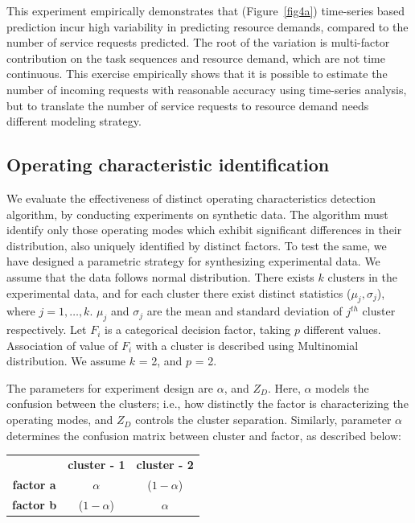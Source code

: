 \documentclass[twoside,leqno,twocolumn]{article}
\begin{document}
This experiment empirically demonstrates that (Figure~\ref{fig4a}) time-series based prediction incur high variability in predicting resource demands, compared to the number of service requests predicted. The root of the variation is multi-factor contribution on the task sequences and resource demand, which are not time continuous. This exercise empirically shows that it is possible to estimate the number of incoming requests with reasonable accuracy using time-series analysis, but to translate the number of service requests to resource demand needs different modeling strategy.   

\subsection{Operating characteristic identification}
We evaluate the effectiveness of distinct operating characteristics detection algorithm, by conducting experiments on synthetic data. The algorithm must identify only those operating modes which exhibit significant differences in their distribution, also uniquely identified by distinct factors. To test the same, we have designed a parametric strategy for synthesizing experimental data. We assume that the data follows normal distribution. There exists $k$ clusters in the experimental data, and for each cluster there exist distinct statistics ($\mu_j, \sigma_j$), where $j={1,\dots,k}$. $\mu_j$ and $\sigma_j$ are the mean and standard deviation of $j^{th}$ cluster respectively. Let $F_i$ is a categorical decision factor, taking $p$ different values. Association of value of $F_i$ with a cluster is described using Multinomial distribution. We assume $k$ = 2, and $p$ = 2.
\par
The parameters for experiment design are $\alpha$, and $Z_D$. Here, $\alpha$ models the confusion between the clusters; i.e., how distinctly the factor is characterizing the operating modes, and $Z_D$ controls the cluster separation. Similarly, parameter ${\alpha}$ determines the confusion matrix between cluster and factor, as described  below:
\begin{center}
\begin{tabular}{c c c}
	           & {\bf cluster - 1}       & {\bf cluster - 2} \\
{\bf factor a} &    $\alpha$         & ($1 - \alpha$) \\
{\bf factor b} &    ($1 - \alpha$)  & $\alpha$ \\
\end{tabular}
\end{center}
\end{document}
